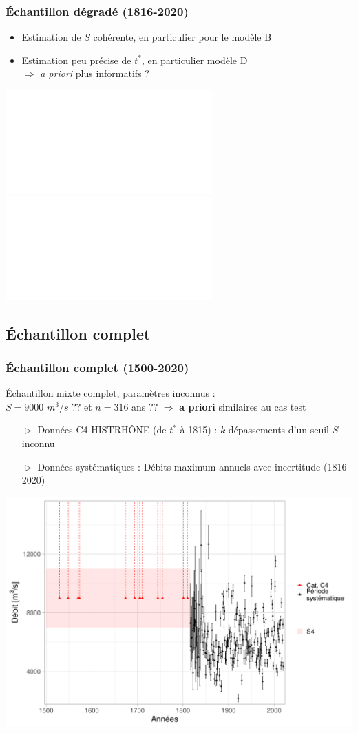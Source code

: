 \documentclass[compress,9pt]{beamer}
\begin{document}
	
	\begin{frame}[c]
		\frametitle{Échantillon dégradé (1816-2020)}
		\begin{minipage}{0.38\textwidth}
			\begin{itemize}
				\item<1> [$\vartriangleright$] Estimation de $S$ cohérente, en particulier pour le modèle B
				\vspace{5pt}				
				\item<2> [$\vartriangleright$] Estimation peu précise de $t^*$, en particulier modèle D\\$\Rightarrow$ \textit{a priori} plus informatifs ?
			\end{itemize}
		\end{minipage}
		\hfill
		\begin{minipage}{.6\textwidth}
			\begin{center}
			\includegraphics<1>[width = .9\textwidth]{./Figures/SArtif.pdf} 
			\includegraphics<2->[width = .9\textwidth]{./Figures/NArtif.pdf} 
			\end{center}
		\end{minipage}
	\end{frame}
	
	\subsection{Échantillon complet}
		\begin{frame}[c]
		\frametitle{Échantillon complet (1500-2020)}
		\vfill
		Échantillon mixte complet, paramètres inconnus :\\
		\vspace{5pt}
		$S = 9000$ $m^3/s$ ?? et $n = 316$ ans ?? $\Rightarrow$ \textbf{a priori} similaires au cas test\\
		\vfill
		\begin{itemize}
			\item [$\vartriangleright$] Données C4 HISTRHÔNE (de $t^*$ à 1815) : $k$ dépassements d'un seuil $S$ inconnu
			\vspace{5pt}			
			\item [$\vartriangleright$] Données systématiques : Débits maximum annuels avec incertitude (1816-2020)
		\end{itemize}
		\vfill
		\centering
		\includegraphics[width = .6\textwidth]{./Figures/EchMixteC4Bcr.pdf} 
		\vfill
	\end{frame}	
	
\end{document}
